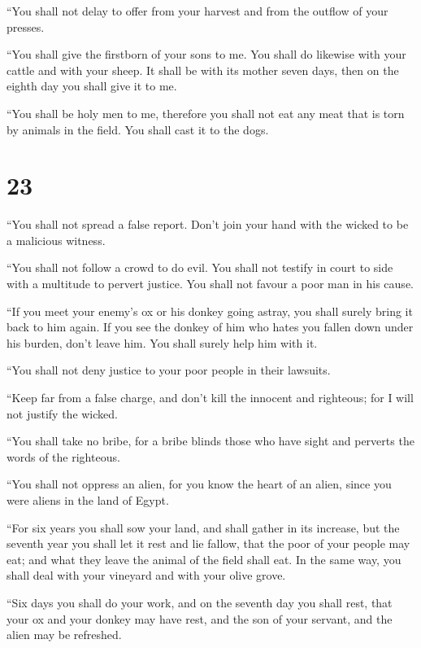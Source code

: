  ``You shall not delay to offer from your harvest and from
the outflow of your presses.

``You shall give the firstborn of your sons to me.  You
shall do likewise with your cattle and with your sheep. It shall be with
its mother seven days, then on the eighth day you shall give it to me.

 ``You shall be holy men to me, therefore you shall not eat
any meat that is torn by animals in the field. You shall cast it to the
dogs.

\hypertarget{section-22}{%
\section{23}\label{section-22}}

 ``You shall not spread a false report. Don't join your hand
with the wicked to be a malicious witness.

 ``You shall not follow a crowd to do evil. You shall not
testify in court to side with a multitude to pervert justice.
 You shall not favour a poor man in his cause.

 ``If you meet your enemy's ox or his donkey going astray,
you shall surely bring it back to him again.  If you see the
donkey of him who hates you fallen down under his burden, don't leave
him. You shall surely help him with it.

 ``You shall not deny justice to your poor people in their
lawsuits.

 ``Keep far from a false charge, and don't kill the innocent
and righteous; for I will not justify the wicked.

 ``You shall take no bribe, for a bribe blinds those who
have sight and perverts the words of the righteous.

 ``You shall not oppress an alien, for you know the heart of
an alien, since you were aliens in the land of Egypt.

 ``For six years you shall sow your land, and shall gather
in its increase,  but the seventh year you shall let it
rest and lie fallow, that the poor of your people may eat; and what they
leave the animal of the field shall eat. In the same way, you shall deal
with your vineyard and with your olive grove.

 ``Six days you shall do your work, and on the seventh day
you shall rest, that your ox and your donkey may have rest, and the son
of your servant, and the alien may be refreshed.

